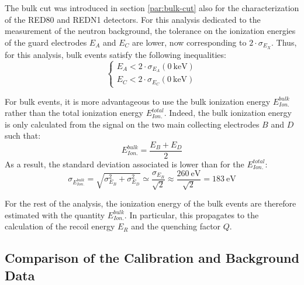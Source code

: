 The bulk cut was introduced in section \ref{par:bulk-cut} also for the characterization of the RED80 and REDN1 detectors. For this analysis dedicated to the measurement of the neutron background, the tolerance on the ionization energies of the guard electrodes $E_A$ and $E_C$ are lower, now corresponding to $2 \cdot \sigma_{E_{X}}$. Thus, for this analysis, bulk events satisfy the following inequalities:
\begin{equation}
\begin{cases}
E_A < 2 \cdot \sigma_{E_A} \left( \SI{0}{\kilo\eV} \right) \\
E_C < 2 \cdot \sigma_{E_C} \left( \SI{0}{\kilo\eV} \right) 
\end{cases}
\end{equation}

For bulk events, it is more advantageous to use the bulk ionization energy $E_{Ion.}^{bulk}$ rather than the total ionization energy $E_{Ion.}^{total}$. Indeed, the bulk ionization energy is only calculated from the signal on the two main collecting electrodes $B$ and $D$ such that:
\begin{equation}
E_{Ion.}^{bulk} = \frac{E_B + E_D}{2}
\end{equation}
As a result, the standard deviation associated is lower than for the $E_{Ion.}^{total}$:
\begin{equation}
\sigma_{E_{Ion.}^{bulk}} = \sqrt{ \sigma_{E_B}^2 + \sigma_{E_D}^2  }
\simeq \frac{\sigma_{E_B}}{\sqrt{2}}
\approx \frac{\SI{260}{\eV}}{\sqrt{2}}
= \SI{183}{\eV}
\end{equation}

For the rest of the analysis, the ionization energy of the bulk events are therefore estimated with the quantity $E_{Ion.}^{bulk}$. In particular, this propagates to the calculation of the recoil energy $E_R$ and the quenching factor $Q$.


\subsection{Comparison of the Calibration and Background Data}
\label{par:comparison-background-calibration}

